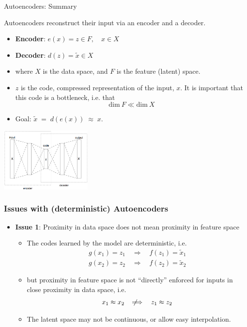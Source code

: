\documentclass[handout,aspectratio=169]{beamer}
\begin{document}
\begin{frame}{Autoencoders: Summary}

  Autoencoders reconstruct their input via an encoder and a decoder.


  \begin{itemize}
  \item \textbf{Encoder}:  $e(x) = z \in F, \quad x \in X$

  \item \textbf{Decoder}:  $d(z) = \tilde x \in X$
  \item where  $X$ is the data space, and  $F$ is the feature (latent) space.
  

\item  $z$ is the code, 
\pause
 compressed representation of the input,  $x$. It is important that this code is a bottleneck, i.e. that
  $$
  \text{dim} \ F \ll \text{dim} \ X
  $$
\item Goal:
  $  \tilde x \;=\; d(e(x)) \;\approx\; x$.
\end{itemize}
\vspace{-9mm}\hspace{8mm}\qquad\qquad\qquad\qquad\qquad\qquad\qquad    \includegraphics[width=1.8in]{pics/lecture_10_1.png}
\end{frame}


\begin{frame}
  \frametitle{Issues with (deterministic) Autoencoders}

  \begin{itemize}
  \item \textbf{Issue 1}: Proximity in data space does not mean proximity in feature space
    \begin{itemize}
    \item The codes learned by the model are deterministic, i.e.
      $$
      \begin{aligned}
        g(x_1) = z_1 \quad\Longrightarrow\quad f(z_1) = \tilde x_1 \\
        g(x_2) = z_2 \quad\Longrightarrow\quad f(z_2) = \tilde x_2 
      \end{aligned}
      $$

   \item but proximity in feature space is not ``directly'' enforced for inputs in close proximity in data space, i.e.
      $$
x_1 \approx x_2\quad\not\!\Longrightarrow  \quad     z_1 \approx z_2 
      $$

    \item The latent space may not be continuous, or allow easy interpolation.


    \end{itemize}
  \end{itemize}
\end{frame}
\end{document}
